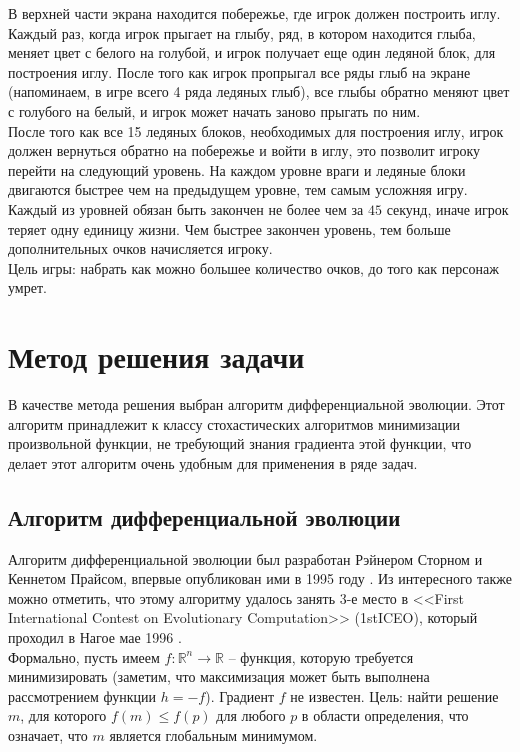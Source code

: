 \documentclass[12pt]{article}
\begin{document}
    В верхней части экрана находится побережье, где игрок должен построить иглу. Каждый раз, когда игрок прыгает на глыбу, ряд, в котором находится глыба, меняет цвет с белого на голубой, и игрок получает еще один ледяной блок, для построения иглу. После того как игрок пропрыгал все ряды глыб на экране (напоминаем, в игре всего 4 ряда ледяных глыб), все глыбы обратно меняют цвет с голубого на белый, и игрок может начать заново прыгать по ним. \\

    После того как все 15 ледяных блоков, необходимых для построения иглу, игрок должен вернуться обратно на побережье и войти в иглу, это позволит игроку перейти на следующий уровень. На каждом уровне враги и ледяные блоки двигаются быстрее чем на предыдущем уровне, тем самым усложняя игру. \\

    Каждый из уровней обязан быть закончен не более чем за $45$ секунд, иначе игрок теряет одну единицу жизни. Чем быстрее закончен уровень, тем больше дополнительных очков начисляется игроку. \\

    Цель игры: набрать как можно большее количество очков, до того как персонаж умрет.

\section{Метод решения задачи}
    В качестве метода решения выбран алгоритм дифференциальной эволюции. Этот алгоритм принадлежит к классу стохастических алгоритмов минимизации произвольной функции, не требующий знания градиента этой функции, что делает этот алгоритм очень удобным для применения в ряде задач.

   \subsection{Алгоритм дифференциальной эволюции}
        Алгоритм дифференциальной эволюции был разработан Рэйнером Сторном и Кеннетом Прайсом, впервые опубликован ими в 1995 году \cite{DE-1995}. Из интересного также можно отметить, что этому алгоритму удалось занять 3-е место в <<First International Contest on Evolutionary Computation>> (1stICEO), который проходил в Нагое мае 1996 \cite{DE}. \\

        Формально, пусть имеем $f: \mathbb{R}^{n} \to \mathbb{R}$ -- функция, которую требуется минимизировать (заметим, что максимизация может быть выполнена рассмотрением функции $h = -f$). Градиент $f$ не известен. Цель: найти решение $m$, для которого $f(m) \leq f(p)$ для любого $p$ в области определения, что означает, что $m$ является глобальным минимумом. \\
\end{document}
